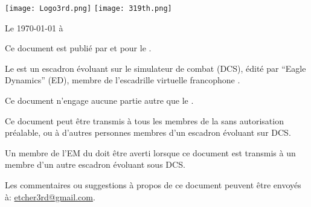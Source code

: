 \thispagestyle{empty}

%

\noindent\texttt{[image: Logo3rd.png]} \hfill \hfill \texttt{[image: 319th.png]}%

\vfil

\begin{flushright}Le \today{} à \currenttime{}\end{flushright}%

\vfil%

\vfil%



Ce document est publié par et pour le \rgt{}.

\vfil%

Le \rgt{} est un escadron évoluant sur le simulateur de combat \dcs{} (DCS), édité par ``Eagle Dynamics'' (ED), membre de l'escadrille virtuelle francophone \thirdwing{}.

\vfil%

Ce document n'engage aucune partie autre que le \rgt{}.

\vfil%

Ce document peut être transmis à tous les membres de la \thirdwing{} sans autorisation préalable, ou à d'autres personnes membres d'un escadron évoluant sur DCS.

\vfil%

Un membre de l'EM du \rgt{} doit être averti lorsque ce document est transmis à un membre d'un autre escadron évoluant sous DCS.

\vfil%

Les commentaires ou suggestions à propos de ce document peuvent être envoyés à: \href{mailto:etcher3rd@gmail.com}{etcher3rd@gmail.com}.

\vfil%


